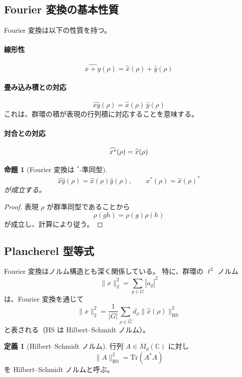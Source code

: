 \documentclass[12pt,a4paper]{ltjarticle}
\newtheorem*{proposition}{命題}
\theoremstyle{definition}
\newtheorem*{definition}{定義}
\begin{document}
\subsection{Fourier 変換の基本性質}

Fourier 変換は以下の性質を持つ。

\paragraph{線形性}
\[
\widehat{x+y}(\rho) = \widehat{x}(\rho) + \widehat{y}(\rho)
\]

\paragraph{畳み込み積との対応}
\[
\widehat{xy}(\rho) = \widehat{x}(\rho)\,\widehat{y}(\rho)
\]
これは、群環の積が表現の行列積に対応することを意味する。

\paragraph{対合との対応}
\[
\widehat{x^*}(\rho) = \widehat{x}(\rho)^{\*}
\]

\begin{proposition}[Fourier 変換は $^*$-準同型]
\[
\widehat{xy}(\rho)=\widehat{x}(\rho)\widehat{y}(\rho),\qquad
\widehat{x^*}(\rho)=\widehat{x}(\rho)^*
\]
が成立する。
\end{proposition}

\begin{proof}
表現 $\rho$ が群準同型であることから
\[
\rho(gh)=\rho(g)\rho(h)
\]
が成立し、計算により従う。
\end{proof}

\subsection{Plancherel 型等式}

Fourier 変換はノルム構造とも深く関係している。
特に、群環の $\ell^2$ ノルム
\[
\|x\|_2^2 = \sum_{g \in G} |a_g|^2
\]
は、Fourier 変換を通じて
\[
\|x\|_2^2 = \frac{1}{|G|} \sum_{\rho \in \widehat{G}} d_\rho \|\widehat{x}(\rho)\|_{\mathrm{HS}}^2
\]
と表される（HS は Hilbert–Schmidt ノルム）。

\begin{definition}[Hilbert–Schmidt ノルム]
行列 $A\in M_d(\mathbb{C})$ に対し
\[
\|A\|_{\mathrm{HS}}^2=\mathrm{Tr}(A^*A)
\]
を Hilbert–Schmidt ノルムと呼ぶ。
\end{definition}
\end{document}
